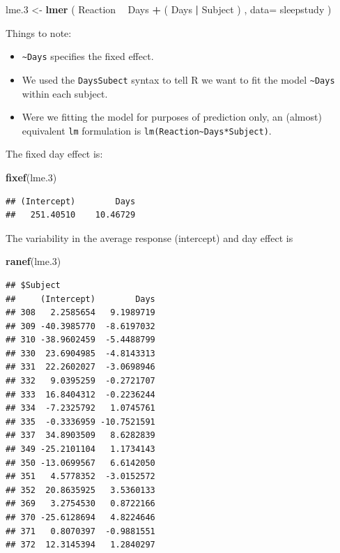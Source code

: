 \documentclass[]{book}
\newenvironment{Shaded}{\begin{snugshade}}{\end{snugshade}}
\newcommand{\KeywordTok}[1]{\textcolor[rgb]{0.13,0.29,0.53}{\textbf{#1}}}
\newcommand{\DataTypeTok}[1]{\textcolor[rgb]{0.13,0.29,0.53}{#1}}
\newcommand{\DecValTok}[1]{\textcolor[rgb]{0.00,0.00,0.81}{#1}}
\newcommand{\StringTok}[1]{\textcolor[rgb]{0.31,0.60,0.02}{#1}}
\newcommand{\OperatorTok}[1]{\textcolor[rgb]{0.81,0.36,0.00}{\textbf{#1}}}
\newcommand{\NormalTok}[1]{#1}
\providecommand{\tightlist}{%
  \setlength{\itemsep}{0pt}\setlength{\parskip}{0pt}}
\theoremstyle{definition}
\theoremstyle{definition}
\theoremstyle{definition}
\theoremstyle{remark}
\begin{document}
\begin{Shaded}
\begin{Highlighting}[]
\NormalTok{lme.}\DecValTok{3}\NormalTok{ <-}\StringTok{ }\KeywordTok{lmer}\NormalTok{ ( Reaction }\OperatorTok{~}\StringTok{ }\NormalTok{Days }\OperatorTok{+}\StringTok{ }\NormalTok{( Days }\OperatorTok{|}\StringTok{ }\NormalTok{Subject ) , }\DataTypeTok{data=}\NormalTok{ sleepstudy )}
\end{Highlighting}
\end{Shaded}

Things to note:

\begin{itemize}
\tightlist
\item
  \texttt{\textasciitilde{}Days} specifies the fixed effect.
\item
  We used the \texttt{Days\textbar{}Subect} syntax to tell R we want to
  fit the model \texttt{\textasciitilde{}Days} within each subject.
\item
  Were we fitting the model for purposes of prediction only, an (almost)
  equivalent \texttt{lm} formulation is
  \texttt{lm(Reaction\textasciitilde{}Days*Subject)}.
\end{itemize}

The fixed day effect is:

\begin{Shaded}
\begin{Highlighting}[]
\KeywordTok{fixef}\NormalTok{(lme.}\DecValTok{3}\NormalTok{)}
\end{Highlighting}
\end{Shaded}

\begin{verbatim}
## (Intercept)        Days 
##   251.40510    10.46729
\end{verbatim}

The variability in the average response (intercept) and day effect is

\begin{Shaded}
\begin{Highlighting}[]
\KeywordTok{ranef}\NormalTok{(lme.}\DecValTok{3}\NormalTok{)}
\end{Highlighting}
\end{Shaded}

\begin{verbatim}
## $Subject
##     (Intercept)        Days
## 308   2.2585654   9.1989719
## 309 -40.3985770  -8.6197032
## 310 -38.9602459  -5.4488799
## 330  23.6904985  -4.8143313
## 331  22.2602027  -3.0698946
## 332   9.0395259  -0.2721707
## 333  16.8404312  -0.2236244
## 334  -7.2325792   1.0745761
## 335  -0.3336959 -10.7521591
## 337  34.8903509   8.6282839
## 349 -25.2101104   1.1734143
## 350 -13.0699567   6.6142050
## 351   4.5778352  -3.0152572
## 352  20.8635925   3.5360133
## 369   3.2754530   0.8722166
## 370 -25.6128694   4.8224646
## 371   0.8070397  -0.9881551
## 372  12.3145394   1.2840297
\end{verbatim}
\end{document}
